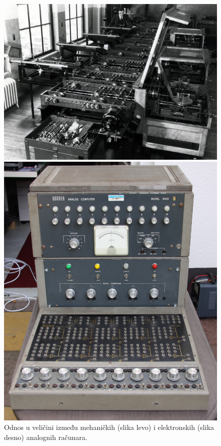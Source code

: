 \documentclass[a4paper]{article}
\begin{document}
		\begin{figure}[!h]
				\begin{minipage}[h]{2 in}
					\centering
					\includegraphics[scale = 0.2]{mehanicki.jpg}
				\end{minipage}
				\hfill
				\begin{minipage}[h]{2in}
					\centering
					\includegraphics[scale = 0.067]{elektronski.jpg}
				\end{minipage}

				\caption{Odnos u veličini između mehaničkih (slika levo) i elektronskih (slika desno) analognih  računara.}
				\label{fig:aVSe}
		\end{figure}
\end{document}
